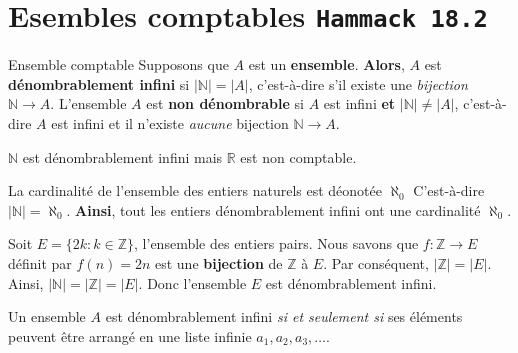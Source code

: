 \documentclass[16pt]{report}
\begin{document}
\begin{multicols*}{2}
\begin{Theorem}{}{}
            \end{Theorem}


    \section{Esembles comptables \texttt{\small{Hammack 18.2}}}


            \begin{Definitionx}{Ensemble comptable}{}
                Supposons que $A$ est un \textbf{ensemble}. \textbf{Alors}, $A$ est 
                \textbf{dénombrablement infini} si $|\mathbb{N}| = |A|$, c'est-à-dire s'il existe 
                une \textit{bijection} $\mathbb{N} \rightarrow A$. L'ensemble $A$ est 
                \textbf{non dénombrable} si $A$ est infini \textbf{et} $|\mathbb{N}| \neq |A|$, c'est-à-dire 
                $A$ est infini et il n'existe \textit{aucune} bijection $\mathbb{N} \rightarrow  A$.   

            \end{Definitionx}


            \begin{note}{}{}
                $\mathbb{N}$ est dénombrablement infini mais $\mathbb{R}$ est non comptable.  
            \end{note}


            \begin{Definitionx}{}{}
                La cardinalité de l'ensemble des entiers naturels est déonotée $\aleph_0$
                C'est-à-dire $|\mathbb{N}| = \aleph_0$. \textbf{Ainsi}, tout les entiers 
                dénombrablement infini ont une cardinalité $\aleph_0$. 
            \end{Definitionx}


            \begin{EExample}{}{}
                Soit $E = \{ 2k : k \in \mathbb{Z} \}$, l'ensemble des entiers pairs. Nous savons que 
                $f : \mathbb{Z} \rightarrow E$ définit par $f(n) = 2n$ est une \textbf{bijection} 
                de $\mathbb{Z}$ à $E$. Par conséquent, $|\mathbb{Z}| = |E|$. Ainsi, 
                $|\mathbb{N}| = |\mathbb{Z}| = |E|$. Donc l'ensemble $E$ est dénombrablement
                infini. 
            \end{EExample}


            \begin{Theorem}{}{}
                Un ensemble $A$ est dénombrablement infini \textit{si et seulement si} ses 
                éléments peuvent être arrangé en une liste infinie $a_1, a_2, a_3, \dots$.
            \end{Theorem}



\end{multicols*}
\end{document}
